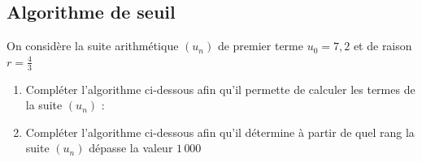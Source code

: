 \documentclass[oneside,12pt]{article}          %
\begin{document}
\subsection{Algorithme de seuil}
On considère la suite arithmétique $(u_n)$ de premier terme $u_0 = 7,2$ et de raison $r = \frac{4}{3}$
\begin{enumerate}
	\item Compléter l'algorithme ci-dessous afin qu'il permette de calculer les termes de la suite $(u_n)$ :
	\begin{center}
		\renewcommand{\arraystretch}{1.25}
	\end{center}
	
	\item Compléter l'algorithme ci-dessous afin qu'il détermine à partir de quel rang la suite $(u_n)$ dépasse la valeur $1\,000$
	\begin{center}
		\renewcommand{\arraystretch}{1.25}
	\end{center}
\end{enumerate}
\end{document}
